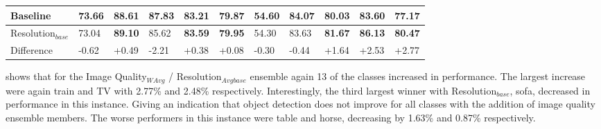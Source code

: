 \documentclass[a4paper,twoside]{article}
\begin{document}
\begin{table}[h]
{\begin{tabular}{lllllllllll}
\multicolumn{1}{|l|}{Baseline}        & \multicolumn{1}{l|}{\textbf{73.66}} & \multicolumn{1}{l|}{88.61} & \multicolumn{1}{l|}{\textbf{87.83}} & \multicolumn{1}{l|}{83.21} & \multicolumn{1}{l|}{79.87}  & \multicolumn{1}{l|}{\textbf{54.60}} & \multicolumn{1}{l|}{\textbf{84.07}} & \multicolumn{1}{l|}{80.03} & \multicolumn{1}{l|}{83.60} & \multicolumn{1}{l|}{77.17} \\ \hline
\multicolumn{1}{|l|}{Resolution$_{base}$} & \multicolumn{1}{l|}{73.04} & \multicolumn{1}{l|}{\textbf{89.10}} & \multicolumn{1}{l|}{85.62} & \multicolumn{1}{l|}{\textbf{83.59}} & \multicolumn{1}{l|}{\textbf{79.95}}  & \multicolumn{1}{l|}{54.30} & \multicolumn{1}{l|}{83.63} & \multicolumn{1}{l|}{\textbf{81.67}} & \multicolumn{1}{l|}{\textbf{86.13}} & \multicolumn{1}{l|}{\textbf{80.47}} \\ \hline
\multicolumn{1}{|l|}{Difference}     & \multicolumn{1}{l|}{-0.62} & \multicolumn{1}{l|}{+0.49} & \multicolumn{1}{l|}{-2.21} & \multicolumn{1}{l|}{+0.38} & \multicolumn{1}{l|}{+0.08}  & \multicolumn{1}{l|}{-0.30} & \multicolumn{1}{l|}{-0.44} & \multicolumn{1}{l|}{+1.64} & \multicolumn{1}{l|}{+2.53} & \multicolumn{1}{l|}{+2.77} \\ \hline
\end{tabular}
%
}
\end{table}
 
 shows that for the Image Quality$_{WAvg}$ / Resolution$_{Avgbase}$ ensemble again 13 of the classes increased in performance. The largest increase were again train and TV with 2.77\% and 2.48\% respectively. Interestingly, the third largest winner with Resolution$_{base}$, sofa, decreased in performance in this instance. Giving an indication that object detection does not improve for all classes with the addition of image quality ensemble members. The worse performers in this instance were table and horse, decreasing by 1.63\% and 0.87\% respectively.
\end{document}
